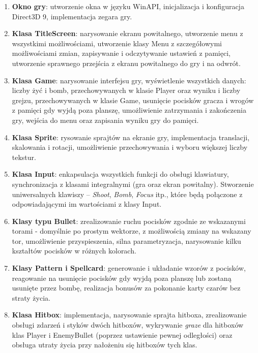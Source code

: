 \documentclass[a4paper,twoside]{article}
\begin{document}
\begin{enumerate}
	
	\item \textbf{Okno gry}: utworzenie okna w języku WinAPI, inicjalizacja i konfiguracja Direct3D 9, implementacja zegara gry.
	
	\item \textbf{Klasa TitleScreen}: narysowanie ekranu powitalnego, utworzenie menu z wszystkimi możliwościami, utworzenie klasy Menu z szczegółowymi możliwościami zmian, zapisywanie i odczytywanie ustawień z pamięci, utworzenie sprawnego przejścia z ekranu powitalnego do gry i na odwrót.
	
	\item \textbf{Klasa Game}: narysowanie interfejsu gry, wyświetlenie wszystkich danych: liczby żyć i bomb, przechowywanych w klasie Player oraz wyniku i liczby grejzu, przechowywanych w klasie Game, usunięcie pocisków gracza i wrogów z pamięci gdy wyjdą poza planszę, umożliwienie zatrzymania i zakończenia gry, wejścia do menu oraz zapisania wyniku gry do pamięci.		
	
	\item \textbf{Klasa Sprite}: rysowanie sprajtów na ekranie gry, implementacja translacji, skalowania i rotacji, umożliwienie przechowywania i wyboru większej liczby tekstur.
	
	\item \textbf{Klasa Input}: enkapsulacja wszystkich funkcji do obsługi klawiatury, synchronizacja z klasami integralnymi (gra oraz ekran powitalny). Stworzenie uniwersalnych klawiszy – \emph{Shoot}, \emph{Bomb}, \emph{Focus} itp., które będą połączone z odpowiadającymi im wartościami z klasy Input.
	
	\item \textbf{Klasy typu Bullet}: zrealizowanie ruchu pocisków zgodnie ze wskazanymi torami - domyślnie po prostym wektorze, z możliwością zmiany na wskazany tor, umożliwienie przyspieszenia, silna parametryzacja, narysowanie kilku kształtów pocisków w różnych kolorach.

	\item \textbf{Klasy Pattern i Spellcard}: generowanie i układanie wzorów z pocisków, reagowanie na usunięcie pocisków gdy wyjdą poza planszę lub zostaną usunięte przez bombę, realizacja bonusów za pokonanie karty czarów bez straty życia.

	\item \textbf{Klasa Hitbox}: implementacja, narysowanie sprajta hitboxa, zrealizowanie obsługi zdarzeń i styków dwóch hitboxów, wykrywanie \textit{graze} dla hitboxów klas Player i EnemyBullet (poprzez ustawienie pewnej odległości) oraz obsługa utraty życia przy nałożeniu się hitboxów tych klas.
	

\end{enumerate}
\end{document}
